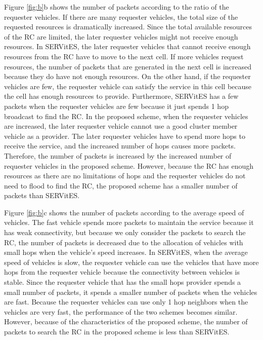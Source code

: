\documentclass[sensors,article,accept,moreauthors,pdftex]{Definitions/mdpi}
\begin{document}
Figure \ref{fig:b}b shows the number of packets according to the ratio of the requester vehicles.
If there are many requester vehicles, the total size of the requested resources is dramatically increased.
Since the total available resources of the RC are limited, the later requester vehicles might not receive enough resources.
In SERVitES, the later requester vehicles that cannot receive enough resources from the RC have to move to the next cell.
If more vehicles request resources, the number of packets that are generated in the next cell is increased because they do have not enough resources.
On the other hand, if the requester vehicles are few, the requester vehicle can satisfy the service in this cell because the cell has enough resources to provide.
Furthermore, SERVitES has a few packets when the requester vehicles are few because it just spends 1 hop broadcast to find the RC.
In the proposed scheme, when the requester vehicles are increased, the later requester vehicle cannot use a good cluster member vehicle as a provider.
The later requester vehicles have to spend more hops to receive the service, and the increased number of hops causes more packets.
Therefore, the number of packets is increased by the increased number of requester vehicles in the proposed scheme.
However, because the RC has enough resources as there are no limitations of hops and the requester vehicles do not need to flood to find the RC, the proposed scheme has a smaller number of packets than SERVitES.

Figure \ref{fig:b}c shows the number of packets according to the average speed of vehicles.
The fast vehicle spends more packets to maintain the service because it has weak connectivity, but because we only consider the packets to search the RC, the number of packets is decreased due to the allocation of vehicles with small hops when the vehicle's speed increases.
In SERVitES, when the average speed of vehicles is slow, the requester vehicle can use the vehicles that have more hops from the requester vehicle because the connectivity between vehicles is stable.
Since the requester vehicle that has the small hops provider spends a small number of packets, it spends a smaller number of packets when the vehicles are fast.
Because the requester vehicles can use only 1 hop neighbors when the vehicles are very fast, the performance of the two schemes becomes similar.
However, because of the characteristics of the proposed scheme, the number of packets to search the RC in the proposed scheme is less than SERVitES.
\end{document}
